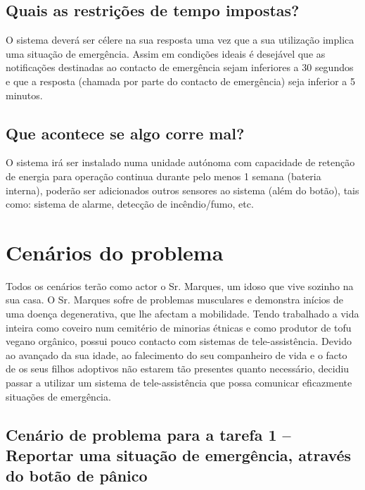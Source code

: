 \subsection{Quais as restrições de tempo impostas?}
O sistema deverá ser célere na sua resposta uma vez que a sua utilização implica uma situação de emergência. Assim em condições ideais é desejável que as notificações destinadas ao contacto de emergência sejam inferiores a 30 segundos e que a resposta (chamada por parte do contacto de emergência) seja inferior a 5 minutos.

\subsection{Que acontece se algo corre mal?}
O sistema irá ser instalado numa unidade autónoma com capacidade de retenção de energia para operação continua durante pelo menos 1 semana (bateria interna), poderão ser adicionados outros sensores ao sistema (além do botão), tais como: sistema de alarme, detecção de incêndio/fumo, etc.

\section{Cenários do problema}

Todos os cenários terão como actor o Sr. Marques, um idoso que vive sozinho na sua casa. O Sr. Marques sofre de problemas musculares e demonstra inícios de uma doença degenerativa, que lhe afectam a mobilidade. Tendo trabalhado a vida inteira como coveiro num cemitério de minorias étnicas e como produtor de tofu vegano orgânico, possui pouco contacto com sistemas de tele-assistência. Devido ao avançado da sua idade, ao falecimento do seu companheiro de vida e o facto de os seus filhos adoptivos não estarem tão presentes quanto necessário, decidiu passar a utilizar um sistema de tele-assistência que possa comunicar eficazmente situações de emergência.

\subsection{Cenário de problema para a tarefa 1 – Reportar uma situação de emergência, através do botão de pânico}

